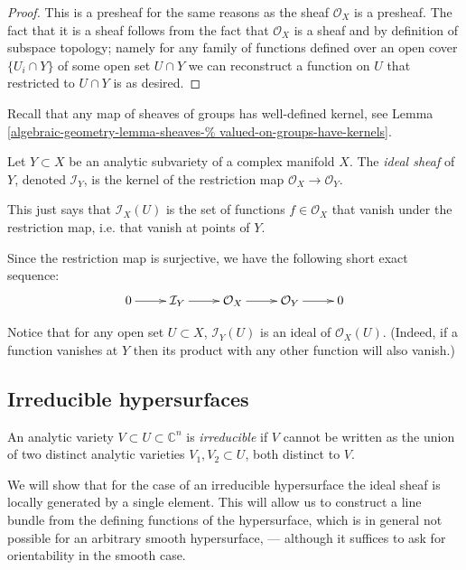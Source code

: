 \begin{proof}
This is a presheaf for the same reasons as
the sheaf $\mathcal{O}_X$ is a presheaf.
The fact that it is a sheaf follows
from the fact that $\mathcal{O}_X$ is a
sheaf and by definition of subspace topology;
namely for any family of functions
defined over an open cover $\{U_i \cap Y\}$
of some open set  $U\cap Y$ we can
reconstruct a function
on $U$ that restricted to $U \cap Y$ is as
desired.
\end{proof}

Recall that any map of sheaves of groups
has well-defined kernel, see Lemma
\ref{algebraic-geometry-lemma-sheaves-%
valued-on-groups-have-kernels}.

\begin{definition}
\label{definition-ideal-sheaf}
Let $Y \subset X$ be an analytic subvariety
of a complex manifold $X$.
The {\it ideal sheaf} of $Y$, denoted
$\mathcal{I}_Y$,
is the kernel
of the restriction map $\mathcal{O}_X \to
\mathcal{O}_Y$.
\end{definition}

\noindent
This just says that $\mathcal{I}_X(U)$ is the
set of functions $f \in \mathcal{O}_X$ that
vanish under the restriction map, i.e.
that vanish at points of $Y$.

Since the restriction map is surjective,
we have the following short exact sequence:
$$
\xymatrix{
0\ar[r]&\mathcal{I}_Y\ar[r]&\mathcal{O}
_X\ar[r]&\mathcal{O}_Y\ar[r]&0
}
$$

\medskip\noindent
Notice that for any open set $U\subset X$,
$\mathcal{I}_Y(U)$ is an ideal of
$\mathcal{O}_X(U)$. (Indeed,
if a function vanishes at $Y$ then its
product
with any other function will also vanish.)

\subsection{Irreducible hypersurfaces}
\label{subsection-irreducible-hypersurfaces}

\begin{definition}
\label{definition-irreducible-variety}
An analytic variety $V\subset U\subset
\mathbb{C}^n$ is {\it irreducible} if
$V$ cannot be written as the union of two
distinct analytic varieties
$V_1,V_2\subset U$, both distinct to $V$.
\end{definition}

\medskip\noindent
We will show that for the case of an
irreducible hypersurface
the ideal sheaf is locally generated by a
single element.
This will allow us to construct a line bundle
from the defining functions
of the hypersurface, which is in general not
possible
for an arbitrary smooth hypersurface,
--- although it suffices to ask for
orientability in the
smooth case.

